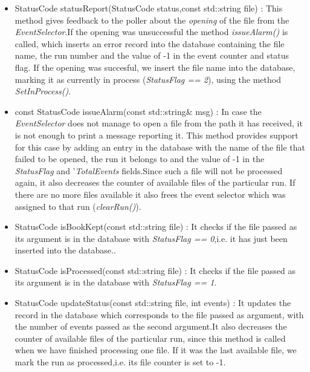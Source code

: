 \begin{itemize}
\item StatusCode statusReport(StatusCode status,const std::string file) : This method gives feedback to the poller about the \textit{opening} of the file from the \textit{EventSelector}.If the opening was unsuccessful the method \textit{issueAlarm()} is called, which inserts an error record into the database containing the file name, the run number and the value of -1 in the event counter and status flag. If the opening was succesful, we insert the file name into the database, marking it as currently in process (\textit{StatusFlag == 2}), using the method \textit{SetInProcess()}.\par

\item const StatusCode issueAlarm(const std::string& msg) : In case the \textit{EventSelector} does not manage to open a file from the path it has received, it is not enough to print a message reporting it. This method provides support for this case by adding an entry in the database with the name of the file that failed to be opened, the run it belongs to and the value of -1 in the \textit{StatusFlag} and '\textit{TotalEvents} fields.Since such a file will not be processed again, it also decreases the counter of available files of the particular run. If there are no more files available it also frees the event selector which was assigned to that run (\textit{clearRun()}).\par

\item StatusCode isBookKept(const std::string file) : It checks if the file passed as its argument is in the database with \textit{StatusFlag == 0},i.e. it has just been inserted into the database..\par

\item StatusCode isProcessed(const std::string file) : It checks if the file passed as its argument is in the database with \textit{StatusFlag == 1}.\par

\item StatusCode updateStatus(const std::string file, int events) : It updates the record in the database which corresponds to the file passed as argument, with the number of events passed as the second argument.It also decreases the counter of available files of the particular run, since this method is called when we have finished processing one file. If it was the last available file, we mark the run as processed,i.e. its file counter is set to -1.\par


\end{itemize}
